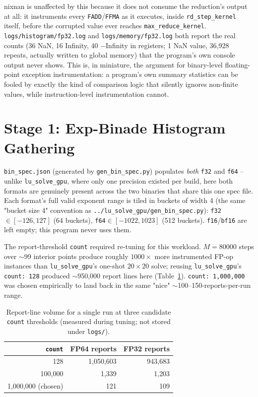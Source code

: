 \documentclass[11pt,a4paper]{article}
\begin{document}
nixnan is unaffected by this because it does not consume the reduction's
output at all: it instruments every \texttt{FADD}/\texttt{FFMA} as it
executes, inside \texttt{rd\_step\_kernel} itself, before the corrupted
value ever reaches \texttt{max\_reduce\_kernel}. \texttt{logs/histogram/fp32.log}
and \texttt{logs/memory/fp32.log} both report the real counts (36 NaN, 16
Infinity, 40 $-$Infinity in registers; 1 NaN value, 36{,}928 repeats,
actually written to global memory) that the program's own console output
never shows. This is, in miniature, the argument for binary-level
floating-point exception instrumentation: a program's own summary
statistics can be fooled by exactly the kind of comparison logic that
silently ignores non-finite values, while instruction-level instrumentation
cannot.

\section{Stage 1: Exp-Binade Histogram Gathering}
\label{sec:histogram}

\texttt{bin\_spec.json} (generated by \texttt{gen\_bin\_spec.py}) populates
\emph{both} \texttt{f32} and \texttt{f64} -- unlike \texttt{lu\_solve\_gpu},
where only one precision existed per build, here both formats are
genuinely present across the two binaries that share this one spec file.
Each format's full valid exponent range is tiled in buckets of width 4
(the same "bucket size 4" convention as
\texttt{../lu\_solve\_gpu/gen\_bin\_spec.py}): \texttt{f32}
$\in[-126,127]$ (64 buckets), \texttt{f64}$\in[-1022,1023]$ (512 buckets).
\texttt{f16}/\texttt{bf16} are left empty; this program never uses them.

The report-threshold \texttt{count} required re-tuning for this workload.
$M=80000$ steps over $\sim$99 interior points produce roughly $1000\times$
more instrumented FP-op instances than \texttt{lu\_solve\_gpu}'s one-shot
$20\times20$ solve; reusing \texttt{lu\_solve\_gpu}'s \texttt{count: 128}
produced $\sim$950,000 report lines here (Table~\ref{tab:count-tuning}).
\texttt{count: 1{,}000{,}000} was chosen empirically to land back in the
same "nice" $\sim$100--150-reports-per-run range.

\begin{table}[ht]
\centering
\begin{tabular}{rrr}
\toprule
\texttt{count} & FP64 reports & FP32 reports \\
\midrule
128 & 1{,}050{,}603 & 943{,}683 \\
100{,}000 & 1{,}339 & 1{,}203 \\
1{,}000{,}000 (chosen) & 121 & 109 \\
\bottomrule
\end{tabular}
\caption{Report-line volume for a single run at three candidate
\texttt{count} thresholds (measured during tuning; not stored under
\texttt{logs/}).}
\label{tab:count-tuning}
\end{table}
\end{document}
